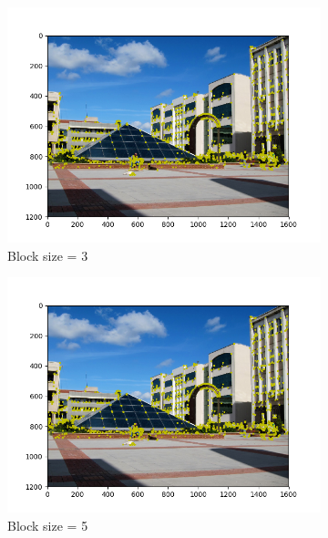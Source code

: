 \documentclass[12pt]{article}
\begin{document}
\begin{figure}[H]
    \centering
    \begin{subfigure}{0.45\textwidth}
        \centering
        \includegraphics[width=\textwidth, height=0.75\textwidth]{images/kuzey_harris-3.png}
        \caption{Block size = 3}
        \label{block-size-3}
    \end{subfigure}
    \begin{subfigure}{0.45\textwidth}
        \centering
        \includegraphics[width=\textwidth, height=0.75\textwidth]{images/kuzey_harris-5.png}
        \caption{Block size = 5}
        \label{block-size-5}
    \end{subfigure}
    \begin{subfigure}{0.45\textwidth}

\end{subfigure}
\end{figure}
\end{document}
